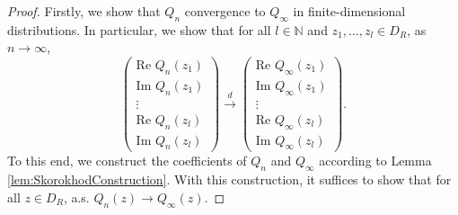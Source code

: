 \documentclass[10pt,a4paper]{amsart}
\begin{document}
\begin{proof}
	Firstly, we show that $Q_n$ convergence to $Q_\infty$ in finite-dimensional distributions. In particular, we show that for all $l \in \mathbb{N}$ and $z_1, \dots, z_l \in D_{R}$, as $n \rightarrow \infty$,
	\begin{equation*}
		\begin{pmatrix}
			\text{Re } Q_n(z_1) \\
			\text{Im }  Q_n(z_1) \\
			\vdots \\
			\text{Re } Q_n(z_l) \\
			\text{Im } Q_n(z_l)
		\end{pmatrix} \xrightarrow[]{d} \begin{pmatrix}
			\text{Re } Q_\infty(z_1) \\
			\text{Im } Q_\infty(z_1) \\
			\vdots \\
			\text{Re } Q_\infty(z_l) \\
			\text{Im } Q_\infty(z_l)
		\end{pmatrix}.
	\end{equation*}
	To this end, we construct the coefficients of $Q_n$ and $Q_\infty$ according to Lemma \ref{lem:SkorokhodConstruction}. With this construction, it suffices to show that for all $z \in D_R$, a.s. $Q_n(z) \to Q_\infty(z)$.
	

\end{proof}
\end{document}
